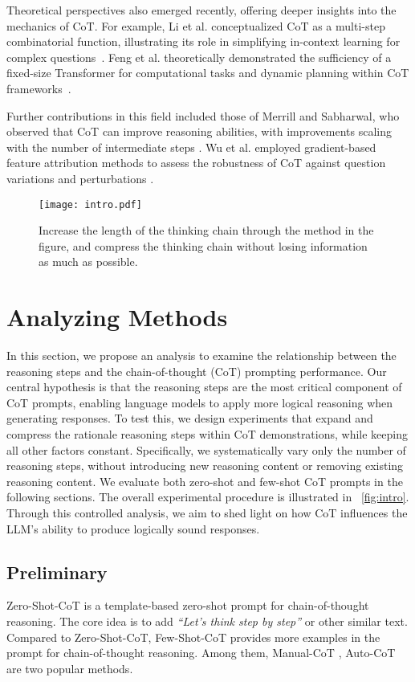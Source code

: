 \documentclass[11pt]{article}
\begin{document}
Theoretical perspectives also emerged recently, offering deeper insights into the mechanics of CoT. For example, Li et al. conceptualized CoT as a multi-step combinatorial function, illustrating its role in simplifying in-context learning for complex questions~\cite{li2023dissecting}. Feng et al. theoretically demonstrated the sufficiency of a fixed-size Transformer for computational tasks and dynamic planning within CoT frameworks~\cite{fu2023complexitybased}.

Further contributions in this field included those of Merrill and Sabharwal, who observed that CoT can improve reasoning abilities, with improvements scaling with the number of intermediate steps \cite{merrill2023expressive}. Wu et al. employed gradient-based feature attribution methods to assess the robustness of CoT against question variations and perturbations \cite{wu2023analyzing}.

\begin{figure*}[ht]
    \centering
    \texttt{[image: intro.pdf]}
    \caption{Increase the length of the thinking chain through the method in the figure, and compress the thinking chain without losing information as much as possible.}
    \label{fig:intro}
\end{figure*}
\section{Analyzing Methods}\label{sec:methods}
In this section, we propose an analysis to examine the relationship between the reasoning steps and the chain-of-thought (CoT) prompting performance. Our central hypothesis is that the reasoning steps are the most critical component of CoT prompts, enabling language models to apply more logical reasoning when generating responses.
To test this, we design experiments that expand and compress the rationale reasoning steps within CoT demonstrations, while keeping all other factors constant. Specifically, we systematically vary only the number of reasoning steps, without introducing new reasoning content or removing existing reasoning content. We evaluate both zero-shot and few-shot CoT prompts in the following sections. The overall experimental procedure is illustrated in ~\autoref{fig:intro}. Through this controlled analysis, we aim to shed light on how CoT influences the LLM's ability to produce logically sound responses.

\subsection{Preliminary}
Zero-Shot-CoT \cite{kojima2023large} is a template-based zero-shot prompt for chain-of-thought reasoning. The core idea is to add \textit{``Let's think step by step''} or other similar text. Compared to Zero-Shot-CoT, Few-Shot-CoT provides more examples in the prompt for chain-of-thought reasoning. Among them, Manual-CoT \cite{wei2022chain}, Auto-CoT \cite{zhang2022automatic} are two popular methods.
\end{document}
